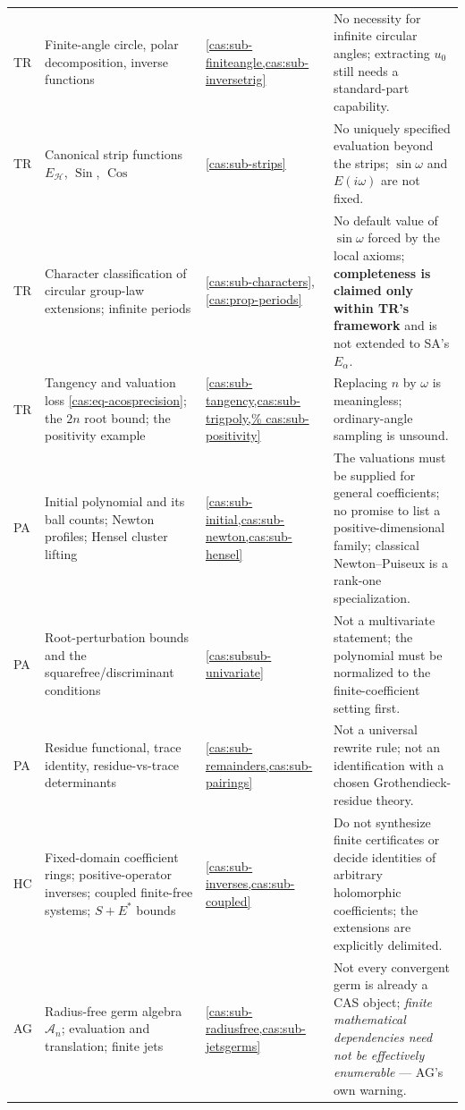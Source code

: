 \documentclass[11pt,letterpaper]{article}
\numberwithin{equation}{section}
\theoremstyle{definition}
\theoremstyle{remark}
\newcommand{\HH}{\mathscr H}
\newcommand{\Acal}{\mathscr A}
\newcommand{\Sin}{\operatorname{Sin}}
\newcommand{\Cos}{\operatorname{Cos}}
\begin{document}
\begin{longtable}{@{}P{0.135\textwidth}P{0.265\textwidth}P{0.265\textwidth}P{0.25\textwidth}@{}}
TR & Finite-angle circle, polar decomposition, inverse functions &
\cref{cas:sub-finiteangle,cas:sub-inversetrig} & No necessity for infinite
circular angles; extracting $u_0$ still needs a standard-part
capability.\\[0.4em]
TR & Canonical strip functions $E_{\HH}$, $\Sin$, $\Cos$ &
\cref{cas:sub-strips} & No uniquely specified evaluation beyond the strips;
$\sin\omega$ and $E(i\omega)$ are not fixed.\\[0.4em]
TR & Character classification of circular group-law extensions; infinite periods
& \cref{cas:sub-characters}, \cref{cas:prop-periods} & No default value of
$\sin\omega$ forced by the local axioms; \textbf{completeness is claimed only
within TR's framework} and is not extended to SA's $E_\alpha$.\\[0.4em]
TR & Tangency and valuation loss \eqref{cas:eq-acosprecision}; the $2n$ root
bound; the positivity example & \cref{cas:sub-tangency,cas:sub-trigpoly,%
cas:sub-positivity} & Replacing $n$ by $\omega$ is meaningless; ordinary-angle
sampling is unsound.\\[0.4em]
PA & Initial polynomial and its ball counts; Newton profiles; Hensel cluster
lifting & \cref{cas:sub-initial,cas:sub-newton,cas:sub-hensel} & The valuations
must be supplied for general coefficients; no promise to list a
positive-dimensional family; classical Newton--Puiseux is a rank-one
specialization.\\[0.4em]
PA & Root-perturbation bounds and the squarefree/discriminant conditions &
\cref{cas:subsub-univariate} & Not a multivariate statement; the polynomial must
be normalized to the finite-coefficient setting first.\\[0.4em]
PA & Residue functional, trace identity, residue-vs-trace determinants &
\cref{cas:sub-remainders,cas:sub-pairings} & Not a universal rewrite rule; not
an identification with a chosen Grothendieck-residue theory.\\[0.4em]
HC & Fixed-domain coefficient rings; positive-operator inverses; coupled
finite-free systems; $S+E^*$ bounds &
\cref{cas:sub-inverses,cas:sub-coupled} & Do not synthesize finite certificates
or decide identities of arbitrary holomorphic coefficients; the extensions are
explicitly delimited.\\[0.4em]
AG & Radius-free germ algebra $\Acal_n$; evaluation and translation; finite jets
& \cref{cas:sub-radiusfree,cas:sub-jetsgerms} & Not every convergent germ is
already a CAS object; \emph{finite mathematical dependencies need not be
effectively enumerable} --- AG's own warning.\\[0.4em]

\end{longtable}
\end{document}
